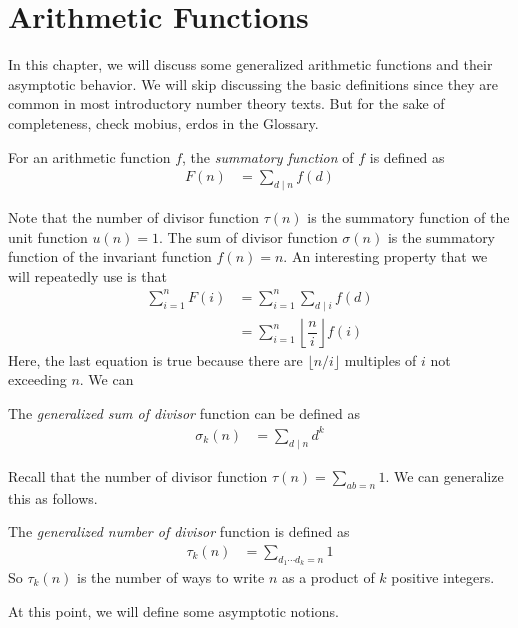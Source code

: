 \documentclass[elemannt.tex]{subfile}
\begin{document}
	\chapter{Arithmetic Functions}
	In this chapter, we will discuss some generalized arithmetic functions and their asymptotic behavior. We will skip discussing the basic definitions since they are common in most introductory number theory texts. But for the sake of completeness, check \gls{mobius}, \gls{erdos} in the Glossary.
		\begin{definition}
			For an arithmetic function $f$, the \textit{summatory function} of $f$ is defined as
				\begin{align*}
					F(n)
						& = \sum_{d\mid n}f(d)
				\end{align*}
		\end{definition}
	Note that the number of divisor function $\tau(n)$ is the summatory function of the unit function $u(n)=1$. The sum of divisor function $\sigma(n)$ is the summatory function of the invariant function $f(n)=n$. An interesting property that we will repeatedly use is that
		\begin{align*}
			\sum_{i=1}^{n}F(i)
				& = \sum_{i=1}^{n}\sum_{d\mid i}f(d)\\
				& = \sum_{i=1}^{n}\left\lfloor{\dfrac{n}{i}}\right\rfloor f(i)
		\end{align*}
	Here, the last equation is true because there are $\lfloor{n/i}\rfloor$ multiples of $i$ not exceeding $n$. We can 
		\begin{definition}
			The \textit{generalized sum of divisor} function can be defined as
				\begin{align*}
					\sigma_{k}(n)
					& = \sum_{d\mid n}d^{k}
			\end{align*}
		\end{definition}
	Recall that the number of divisor function $\tau(n)=\sum_{ab=n}1$. We can generalize this as follows.
		\begin{definition}
			The \textit{generalized number of divisor} function is defined as
				\begin{align*}
					\tau_{k}(n)
						& = \sum_{d_{1}\cdots d_{k}=n}1
				\end{align*}
			So $\tau_{k}(n)$ is the number of ways to write $n$ as a product of $k$ positive integers. 
		\end{definition}
	At this point, we will define some asymptotic notions.
\end{document}
